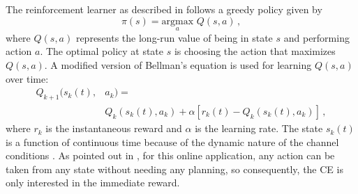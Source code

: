 \documentclass[journal]{IEEEtran}
\begin{document}
The reinforcement learner as described in \cite{paulo-jrnl} follows a greedy policy given by
\begin{equation}
\pi(s) = \underset{a}{\text{argmax}} \,\,Q(s,a)\,,
\end{equation}
where $Q(s,a)$ represents the long-run value of being in state $s$ and performing action $a$.  The optimal policy at state $s$ is choosing the action that maximizes $Q(s,a)$.  A modified version of Bellman's equation is used for learning $Q(s,a)$ over time:
\begin{equation}
\begin{split}
Q_{k+1}(s_k(t),&a_k)= \\ &Q_k(s_k(t),a_k)+\alpha[r_k(t)-Q_k(s_k(t),a_k)]\,,
\end{split}
\end{equation}
where $r_k$ is the instantaneous reward and $\alpha$ is the learning rate.  The state $s_k(t)$ is a function of continuous time because of the dynamic nature of the channel conditions \cite{paulo-jrnl}.  As pointed out in \cite{aiaa-paulo}, for this online application, any action can be taken from any state without needing any planning, so consequently, the CE is only interested in the immediate reward.
\end{document}
